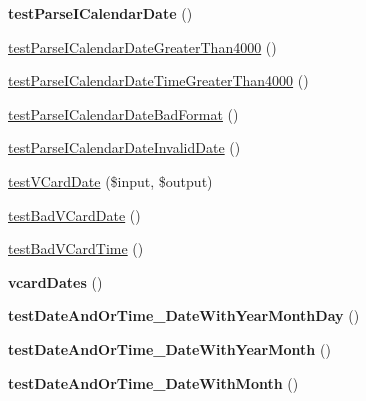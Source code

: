 \begin{DoxyCompactItemize}
{\bfseries test\+Parse\+I\+Calendar\+Date} ()
\item 
\mbox{\hyperlink{class_sabre_1_1_v_object_1_1_date_time_parser_test_a8b395b090e8f8ec0974defac38c0373a}{test\+Parse\+I\+Calendar\+Date\+Greater\+Than4000}} ()
\item 
\mbox{\hyperlink{class_sabre_1_1_v_object_1_1_date_time_parser_test_a7fbaff66d2a0303e730afb552636f1df}{test\+Parse\+I\+Calendar\+Date\+Time\+Greater\+Than4000}} ()
\item 
\mbox{\hyperlink{class_sabre_1_1_v_object_1_1_date_time_parser_test_ae5a77f8ef7a6fe9669ece7311c498e65}{test\+Parse\+I\+Calendar\+Date\+Bad\+Format}} ()
\item 
\mbox{\hyperlink{class_sabre_1_1_v_object_1_1_date_time_parser_test_a87c824ac8cb7aed24c5beb33c523738c}{test\+Parse\+I\+Calendar\+Date\+Invalid\+Date}} ()
\item 
\mbox{\hyperlink{class_sabre_1_1_v_object_1_1_date_time_parser_test_aceae4a953d72302a8803780b325c0f58}{test\+V\+Card\+Date}} (\$input, \$output)
\item 
\mbox{\hyperlink{class_sabre_1_1_v_object_1_1_date_time_parser_test_aad34b18a503ff7d0e2febc678f4156dc}{test\+Bad\+V\+Card\+Date}} ()
\item 
\mbox{\hyperlink{class_sabre_1_1_v_object_1_1_date_time_parser_test_a4a923b93c571c38007544a585a172366}{test\+Bad\+V\+Card\+Time}} ()
\item 
\mbox{\label{class_sabre_1_1_v_object_1_1_date_time_parser_test_a8589a3d8d670acce5d81256558cf06fb}} 
{\bfseries vcard\+Dates} ()
\item 
\mbox{\label{class_sabre_1_1_v_object_1_1_date_time_parser_test_a282586562309560c14350a655ef09225}} 
{\bfseries test\+Date\+And\+Or\+Time\+\_\+\+Date\+With\+Year\+Month\+Day} ()
\item 
\mbox{\label{class_sabre_1_1_v_object_1_1_date_time_parser_test_a1d91361356154020e7dbdabf0d36d55e}} 
{\bfseries test\+Date\+And\+Or\+Time\+\_\+\+Date\+With\+Year\+Month} ()
\item 
\mbox{\label{class_sabre_1_1_v_object_1_1_date_time_parser_test_a6e94d62914b4a6aa0cacf052756c3ece}} 
{\bfseries test\+Date\+And\+Or\+Time\+\_\+\+Date\+With\+Month} ()

\end{DoxyCompactItemize}
